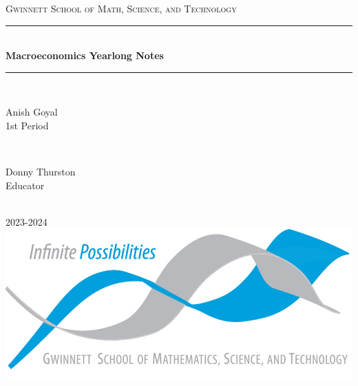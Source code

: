 \begin{titlepage}

    \newcommand{\HRule}{\rule{\linewidth}{0.5mm}}
    
    \center
    
    \vspace{10cm}

    \textsc{\LARGE Gwinnett School of Math, Science, and Technology }\\[0.3cm]
    
    \vspace{0.5cm}

    \HRule \\[0.4cm]
    { \huge \bfseries Macroeconomics Yearlong Notes}\\[0.03cm]
    \HRule \\[1.5cm]
    
    \begin{minipage}{0.4\textwidth}
    \begin{flushleft} \Large
    Anish Goyal \\1st Period
    \end{flushleft}
    \end{minipage}
    ~
    \begin{minipage}{0.4\textwidth}
    \begin{flushright} \Large
    Donny Thurston\\Educator
    \end{flushright}
    \end{minipage}\\[1cm]
    
    {\huge 2023-2024}\\[1cm]
    
    \includegraphics{img/logo.png}\\
    \vfill
    \end{titlepage}